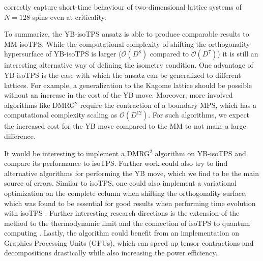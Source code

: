 correctly capture short-time behaviour of two-dimensional lattice systems of $N = 128$ spins even at criticality. \par
To summarize, the YB-isoTPS ansatz is able to produce comparable results to MM-isoTPS. While the computational complexity of shifting the orthogonality hypersurface of YB-isoTPS is larger ($\mathcal{O}(D^8)$ compared to $\mathcal{O}(D^7)$) it is still an interesting alternative way of defining the isometry condition. One advantage of YB-isoTPS is the ease with which the ansatz can be generalized to different lattices. For example, a generalization to the Kagome lattice should be possible without an increase in the cost of the YB move. Moreover, more involved algorithms like DMRG$^2$ require the contraction of a boundary MPS, which has a computational complexity scaling as $\mathcal{O}(D^{12})$. For such algorithms, we expect the increased cost for the YB move compared to the MM to not make a large difference. \par
It would be interesting to implement a DMRG$^2$ algorithm on YB-isoTPS and compare its performance to isoTPS. Further work could also try to find alternative algorithms for performing the YB move, which we find to be the main source of errors. Similar to isoTPS, one could also implement a variational optimization on the complete column when shifting the orthogonality surface, which was found to be essential for good results when performing time evolution with isoTPS \cite{cite:efficient_simulation_of_dynamics_in_two_dimensional_quantum_spin_systems}. Further interesting research directions is the extension of the method to the thermodynamic limit and the connection of isoTPS to quantum computing \cite{cite:topological_quantum_phase_transitions_in_2D_isometric_tensor_networks, cite:quantum_circuits_for_2D_isometric_tensor_networks}. Lastly, the algorithm could benefit from an implementation on Graphics Processing Units (GPUs), which can speed up tensor contractions and decompositions drastically while also increasing the power efficiency.